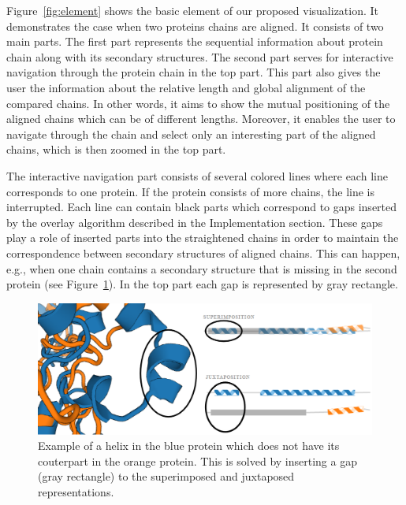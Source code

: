 \documentclass[twocolumn]{bmcart}%
\begin{document}
Figure~\ref{fig:element} shows the basic element of our proposed visualization.
It demonstrates the case when two proteins chains are aligned.
It consists of two main parts.
The first part represents the sequential information about protein chain along with its secondary structures.
The second part serves for interactive navigation through the protein chain in the top part. 
This part also gives the user the information about the relative length and global alignment of the compared chains.
In other words, it aims to show the mutual positioning of the aligned chains which can be of different lengths.
Moreover, it enables the user to navigate through the chain and select only an interesting part of the aligned chains, which is then zoomed in the top part.


The interactive navigation part consists of several colored lines where each line corresponds to one protein.
If the protein consists of more chains, the line is interrupted.
Each line can contain black parts which correspond to gaps inserted by the overlay algorithm described in the Implementation section.
These gaps play a role of inserted parts into the straightened chains in order to maintain the correspondence between secondary structures of aligned chains. 
This can happen, e.g., when one chain contains a secondary structure that is missing in the second protein (see Figure~\ref{fig:gap}).
In the top part each gap is represented by gray rectangle.

\begin{figure}[ht]
  \centering
  \includegraphics[width=0.9\linewidth]{pics/gap2.png}
  \caption{Example of a helix in the blue protein which does not have its couterpart in the orange protein. This is solved by inserting a gap (gray rectangle) to the superimposed and juxtaposed representations.}
  \label{fig:gap}
\end{figure}
\end{document}
